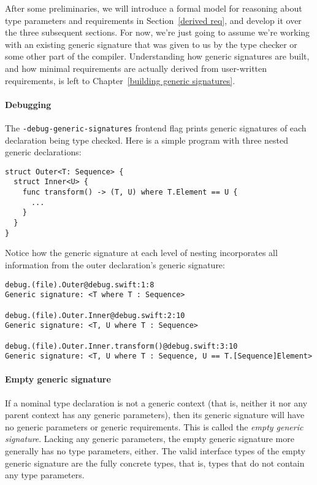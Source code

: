 \documentclass[../generics]{subfiles}
\begin{document}
After some preliminaries, we will introduce a formal model for reasoning about type parameters and requirements in Section~\ref{derived req}, and develop it over the three subsequent sections. For now, we're just going to assume we're working with an existing generic signature that was given to us by the type checker or some other part of the compiler. Understanding how generic signatures are built, and how minimal requirements are actually derived from user-written requirements, is left to Chapter~\ref{building generic signatures}.

\paragraph{Debugging} The \texttt{-debug-generic-signatures} frontend flag prints generic signatures of each declaration being type checked. Here is a simple program with three nested generic declarations:
\begin{Verbatim}
struct Outer<T: Sequence> {
  struct Inner<U> {
    func transform() -> (T, U) where T.Element == U {
      ...
    }
  }
}
\end{Verbatim}
Notice how the generic signature at each level of nesting incorporates all information from the outer declaration's generic signature:
\begin{Verbatim}
debug.(file).Outer@debug.swift:1:8
Generic signature: <T where T : Sequence>

debug.(file).Outer.Inner@debug.swift:2:10
Generic signature: <T, U where T : Sequence>

debug.(file).Outer.Inner.transform()@debug.swift:3:10
Generic signature: <T, U where T : Sequence, U == T.[Sequence]Element>
\end{Verbatim}

\paragraph{Empty generic signature}
If a nominal type declaration is not a generic context (that is, neither it nor any parent context has any generic parameters), then its generic signature will have no generic parameters or generic requirements. This is called the \emph{empty generic signature}. Lacking any generic parameters, the empty generic signature more generally has no type parameters, either. The valid interface types of the empty generic signature are the fully concrete types, that is, types that do not contain any type parameters.
\end{document}
